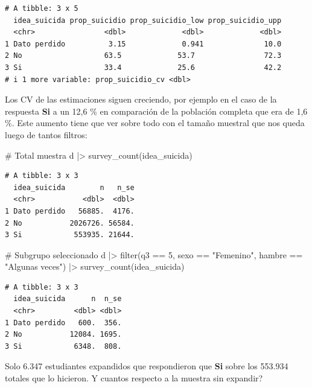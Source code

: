 \documentclass[
  spanish,
  a4paper,
]{scrbook}
\newenvironment{Shaded}{\begin{snugshade}}{\end{snugshade}}
\newcommand{\CommentTok}[1]{\textcolor[rgb]{0.37,0.37,0.37}{#1}}
\newcommand{\DecValTok}[1]{\textcolor[rgb]{0.68,0.00,0.00}{#1}}
\newcommand{\FunctionTok}[1]{\textcolor[rgb]{0.28,0.35,0.67}{#1}}
\newcommand{\NormalTok}[1]{\textcolor[rgb]{0.00,0.23,0.31}{#1}}
\newcommand{\SpecialCharTok}[1]{\textcolor[rgb]{0.37,0.37,0.37}{#1}}
\newcommand{\StringTok}[1]{\textcolor[rgb]{0.13,0.47,0.30}{#1}}
\begin{document}
\begin{verbatim}
# A tibble: 3 x 5
  idea_suicida prop_suicidio prop_suicidio_low prop_suicidio_upp
  <chr>                <dbl>             <dbl>             <dbl>
1 Dato perdido          3.15             0.941              10.0
2 No                   63.5             53.7                72.3
3 Si                   33.4             25.6                42.2
# i 1 more variable: prop_suicidio_cv <dbl>
\end{verbatim}

Los CV de las estimaciones siguen creciendo, por ejemplo en el caso de
la respuesta \textbf{Si} a un 12,6 \% en comparación de la población
completa que era de 1,6 \%. Este aumento tiene que ver sobre todo con el
tamaño muestral que nos queda luego de tantos filtros:

\begin{Shaded}
\begin{Highlighting}[]
\CommentTok{\# Total muestra}
\NormalTok{d }\SpecialCharTok{|\textgreater{}}
  \FunctionTok{survey\_count}\NormalTok{(idea\_suicida)}
\end{Highlighting}
\end{Shaded}

\begin{verbatim}
# A tibble: 3 x 3
  idea_suicida        n   n_se
  <chr>           <dbl>  <dbl>
1 Dato perdido   56885.  4176.
2 No           2026726. 56584.
3 Si            553935. 21644.
\end{verbatim}

\begin{Shaded}
\begin{Highlighting}[]
\CommentTok{\# Subgrupo seleccionado}
\NormalTok{d }\SpecialCharTok{|\textgreater{}}
  \FunctionTok{filter}\NormalTok{(q3 }\SpecialCharTok{==} \DecValTok{5}\NormalTok{, sexo }\SpecialCharTok{==} \StringTok{"Femenino"}\NormalTok{, hambre }\SpecialCharTok{==} \StringTok{"Algunas veces"}\NormalTok{) }\SpecialCharTok{|\textgreater{}}
  \FunctionTok{survey\_count}\NormalTok{(idea\_suicida)}
\end{Highlighting}
\end{Shaded}

\begin{verbatim}
# A tibble: 3 x 3
  idea_suicida      n  n_se
  <chr>         <dbl> <dbl>
1 Dato perdido   600.  356.
2 No           12084. 1695.
3 Si            6348.  808.
\end{verbatim}

Solo 6.347 estudiantes expandidos que respondieron que \textbf{Si} sobre
los 553.934 totales que lo hicieron. Y cuantos respecto a la muestra sin
expandir?
\end{document}
